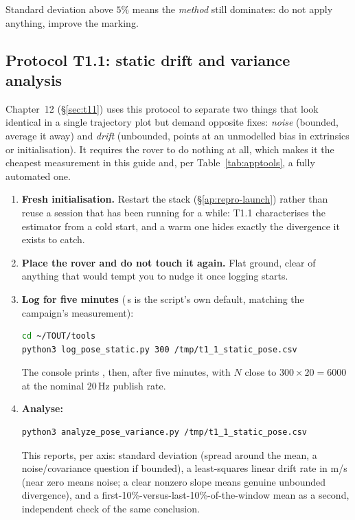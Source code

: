 \noindent Standard deviation above $5\%$ means the \emph{method} still
dominates: do not apply anything, improve the marking.

\subsection{Protocol T1.1: static drift and variance analysis}
\label{ap:repro-t11}
Chapter~12 (\S\ref{sec:t11}) uses this protocol to separate two things that
look identical in a single trajectory plot but demand opposite fixes:
\emph{noise} (bounded, average it away) and \emph{drift} (unbounded, points
at an unmodelled bias in extrinsics or initialisation). It requires the
rover to do nothing at all, which makes it the cheapest measurement in this
guide and, per Table~\ref{tab:apptools}, a fully automated one.

\begin{enumerate}[leftmargin=1.4em]
\item \textbf{Fresh initialisation.} Restart the stack
  (\S\ref{ap:repro-launch}) rather than reuse a session that has been
  running for a while: T1.1 characterises the estimator from a cold start,
  and a warm one hides exactly the divergence it exists to catch.
\item \textbf{Place the rover and do not touch it again.} Flat ground, clear
  of anything that would tempt you to nudge it once logging starts.
\item \textbf{Log for five minutes} (\,s is the script's own
  default, matching the campaign's measurement):
\begin{lstlisting}[language=bash]
cd ~/TOUT/tools
python3 log_pose_static.py 300 /tmp/t1_1_static_pose.csv
\end{lstlisting}
  The console prints , then, after five minutes,
   with $N$ close to
  $300 \times 20 = 6000$ at the nominal $20$\,Hz publish rate.
\item \textbf{Analyse:}
\begin{lstlisting}[language=bash]
python3 analyze_pose_variance.py /tmp/t1_1_static_pose.csv
\end{lstlisting}
  This reports, per axis: standard deviation (spread around the mean, a
  noise/covariance question if bounded), a least-squares linear drift rate
  in m/s (near zero means noise; a clear nonzero slope means genuine
  unbounded divergence), and a first-10\%-versus-last-10\%-of-the-window
  mean as a second, independent check of the same conclusion.
\end{enumerate}

